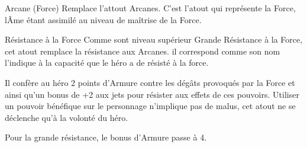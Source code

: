 \begin{paperbox}{Arcane (Force)}
    Remplace l'attout Arcanes. C'est l'atout qui représente la Force, l\^Ame étant assimilé au niveau de maîtrise de la Force.
\end{paperbox}

\begin{paperbox}{Résistance à la Force}
    Comme sont niveau supérieur Grande Résistance à la Force, cet atout remplace la résistance aux Arcanes. il correspond comme son nom l'indique à la capacité que le héro a de résisté à la force.

    Il confère au héro 2 points d’Armure contre les dégâts provoqués par la Force et ainsi qu'un bonus de +2 aux jets pour résister aux effets de ces pouvoirs. Utiliser un pouvoir bénéfique sur le personnage n'implique pas de malus, cet atout ne se déclenche qu'à la volonté du héro.

    Pour la grande résistance, le bonus d'Armure passe à 4.
\end{paperbox}

